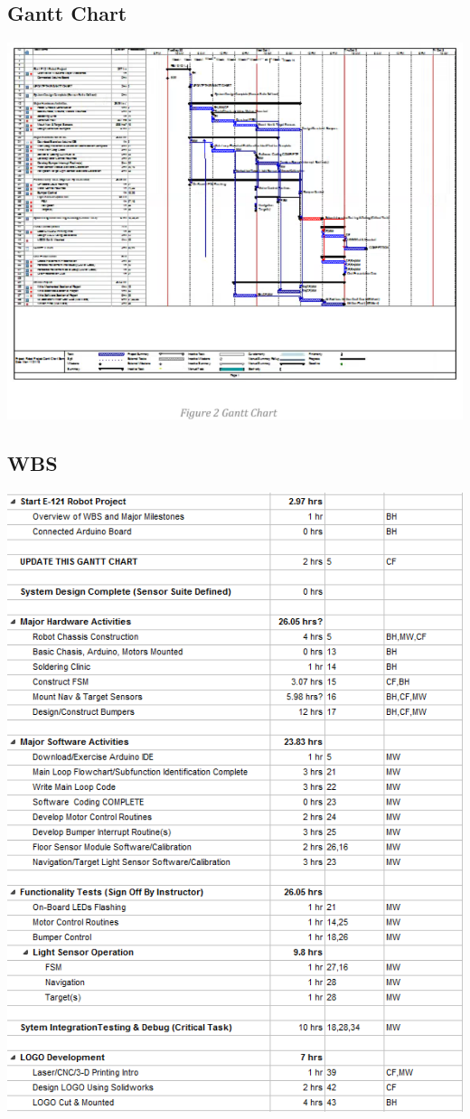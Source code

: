 \documentclass{article}
\begin{document}
\subsection{Gantt Chart}
\includegraphics[width=\textwidth]{Gantt_Chart.png}
\subsection{WBS}
\includegraphics[height=\textheight]{GanttChartBreakdown.png}
\end{document}
